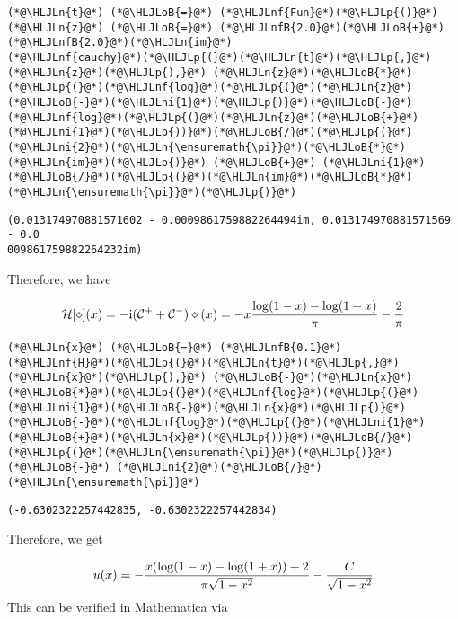 \documentclass[12pt,a4paper]{article}
\newcommand{\HLJLn}[1]{#1}
\newcommand{\HLJLnf}[1]{\textcolor[RGB]{66,102,213}{#1}}
\newcommand{\HLJLnfB}[1]{\textcolor[RGB]{59,151,46}{#1}}
\newcommand{\HLJLni}[1]{\textcolor[RGB]{59,151,46}{#1}}
\newcommand{\HLJLoB}[1]{\textcolor[RGB]{102,102,102}{\textbf{#1}}}
\newcommand{\HLJLp}[1]{#1}
\def\I{ {\rm i} }
\def\CC{ {\cal C} }
\def\HH{ {\cal H} }
\begin{document}
\begin{lstlisting}
(*@\HLJLn{t}@*) (*@\HLJLoB{=}@*) (*@\HLJLnf{Fun}@*)(*@\HLJLp{()}@*)
(*@\HLJLn{z}@*) (*@\HLJLoB{=}@*) (*@\HLJLnfB{2.0}@*)(*@\HLJLoB{+}@*)(*@\HLJLnfB{2.0}@*)(*@\HLJLn{im}@*)
(*@\HLJLnf{cauchy}@*)(*@\HLJLp{(}@*)(*@\HLJLn{t}@*)(*@\HLJLp{,}@*) (*@\HLJLn{z}@*)(*@\HLJLp{),}@*) (*@\HLJLn{z}@*)(*@\HLJLoB{*}@*)(*@\HLJLp{(}@*)(*@\HLJLnf{log}@*)(*@\HLJLp{(}@*)(*@\HLJLn{z}@*)(*@\HLJLoB{-}@*)(*@\HLJLni{1}@*)(*@\HLJLp{)}@*)(*@\HLJLoB{-}@*)(*@\HLJLnf{log}@*)(*@\HLJLp{(}@*)(*@\HLJLn{z}@*)(*@\HLJLoB{+}@*)(*@\HLJLni{1}@*)(*@\HLJLp{))}@*)(*@\HLJLoB{/}@*)(*@\HLJLp{(}@*)(*@\HLJLni{2}@*)(*@\HLJLn{\ensuremath{\pi}}@*)(*@\HLJLoB{*}@*)(*@\HLJLn{im}@*)(*@\HLJLp{)}@*) (*@\HLJLoB{+}@*) (*@\HLJLni{1}@*)(*@\HLJLoB{/}@*)(*@\HLJLp{(}@*)(*@\HLJLn{im}@*)(*@\HLJLoB{*}@*)(*@\HLJLn{\ensuremath{\pi}}@*)(*@\HLJLp{)}@*)
\end{lstlisting}

\begin{lstlisting}
(0.013174970881571602 - 0.0009861759882264494im, 0.013174970881571569 - 0.0
009861759882264232im)
\end{lstlisting}


Therefore, we have

\[
\HH[\diamond](x) = -\I (\CC^+ + \CC^-) \diamond(x) = -x {\log(1-x) - \log(1+x) \over \pi} -{2 \over \pi}
\]

\begin{lstlisting}
(*@\HLJLn{x}@*) (*@\HLJLoB{=}@*) (*@\HLJLnfB{0.1}@*)
(*@\HLJLnf{H}@*)(*@\HLJLp{(}@*)(*@\HLJLn{t}@*)(*@\HLJLp{,}@*)(*@\HLJLn{x}@*)(*@\HLJLp{),}@*) (*@\HLJLoB{-}@*)(*@\HLJLn{x}@*)(*@\HLJLoB{*}@*)(*@\HLJLp{(}@*)(*@\HLJLnf{log}@*)(*@\HLJLp{(}@*)(*@\HLJLni{1}@*)(*@\HLJLoB{-}@*)(*@\HLJLn{x}@*)(*@\HLJLp{)}@*)(*@\HLJLoB{-}@*)(*@\HLJLnf{log}@*)(*@\HLJLp{(}@*)(*@\HLJLni{1}@*)(*@\HLJLoB{+}@*)(*@\HLJLn{x}@*)(*@\HLJLp{))}@*)(*@\HLJLoB{/}@*)(*@\HLJLp{(}@*)(*@\HLJLn{\ensuremath{\pi}}@*)(*@\HLJLp{)}@*) (*@\HLJLoB{-}@*) (*@\HLJLni{2}@*)(*@\HLJLoB{/}@*)(*@\HLJLn{\ensuremath{\pi}}@*)
\end{lstlisting}

\begin{lstlisting}
(-0.6302322257442835, -0.6302322257442834)
\end{lstlisting}


Therefore, we get

\[
u(x) = - {x(\log(1-x) - \log(1+x))+2 \over  \pi\sqrt{1-x^2}} - {C \over \sqrt{1-x^2}}
\]
This can be verified in Mathematica via
\end{document}
